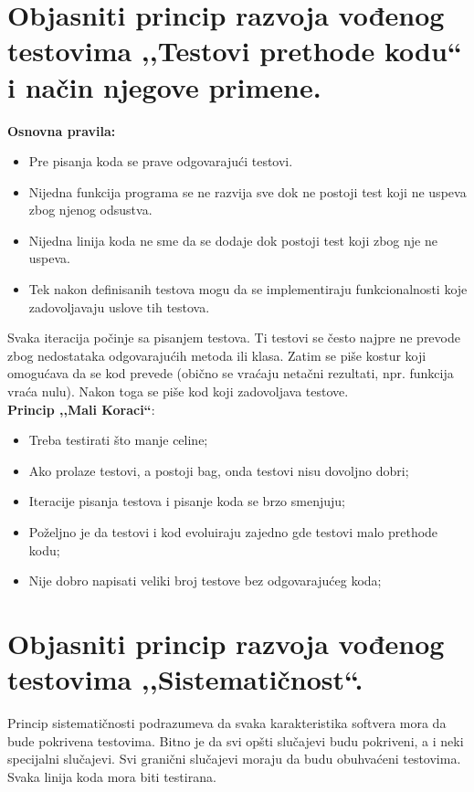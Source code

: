 \documentclass[a4paper]{article}
\begin{document}
\section{Objasniti princip razvoja vođenog testovima ,,Testovi prethode kodu`` i način njegove primene.}
  \noindent \textbf{Osnovna pravila:}
  \begin{itemize}
    \item Pre pisanja koda se prave odgovarajući testovi.
    \item Nijedna funkcija programa se ne razvija sve dok ne postoji test koji ne uspeva zbog 
          njenog odsustva.
    \item Nijedna linija koda ne sme da se dodaje dok postoji test koji zbog nje ne uspeva.
    \item Tek nakon definisanih testova mogu da se implementiraju funkcionalnosti koje
          zadovoljavaju uslove tih testova.
  \end{itemize}
  Svaka iteracija počinje sa pisanjem testova. Ti testovi se često najpre ne prevode zbog nedostataka
  odgovarajućih metoda ili klasa. Zatim se piše kostur koji omogućava da se kod prevede (obično
  se vraćaju netačni rezultati, npr. funkcija vraća nulu). Nakon toga se piše kod koji zadovoljava
  testove. \\

  \noindent \textbf{Princip ,,Mali Koraci``}:
  \begin{itemize}
    \item Treba testirati što manje celine;
    \item Ako prolaze testovi, a postoji bag, onda testovi nisu dovoljno dobri;
    \item Iteracije pisanja testova i pisanje koda se brzo smenjuju;
    \item Poželjno je da testovi i kod evoluiraju zajedno gde testovi malo prethode kodu;
    \item Nije dobro napisati veliki broj testove bez odgovarajućeg koda;
  \end{itemize}

\section{Objasniti princip razvoja vođenog testovima ,,Sistematičnost``.}
  Princip sistematičnosti podrazumeva da svaka karakteristika softvera mora da bude pokrivena
  testovima. Bitno je da svi opšti slučajevi budu pokriveni, a i neki specijalni slučajevi.
  Svi granični slučajevi moraju da budu obuhvaćeni testovima. Svaka linija koda mora biti
  testirana. \\
\end{document}
